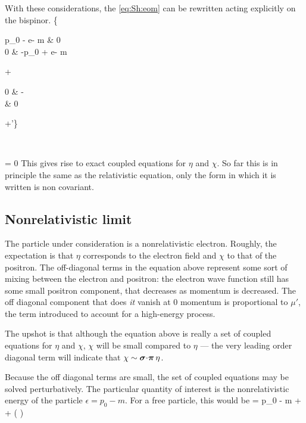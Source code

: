 With these considerations, the \eqref{eq:Sh:eom} can be rewritten acting explicitly on the bispinor.
\scriptsize
\beq \label{eq:Sh:matrixEOM}
	\left\{
		\begin{pmatrix}
			p_0 - e\Phi	- m &	0	\\
			0	&	-p_0 + e\Phi - m	\\
		\end{pmatrix}
		+
		\begin{pmatrix}	0 & -\sigdotg{\pi} \\  \sigdotg{\pi} & 0 \end{pmatrix} 
		+\mu' 
	\right\} \begin{pmatrix} \eta \\ \chi \end{pmatrix}
		= 0
\eeq
\normalsize
This gives rise to exact coupled equations for $\eta$ and $\chi$.  So far this is in principle the same as the relativistic equation, only the form in which it is written is non covariant.

\subsection{Nonrelativistic limit}

The particle under consideration is a nonrelativistic electron.  Roughly, the expectation is that $\eta$ corresponds to the electron field and $\chi$ to that of the positron.  The off-diagonal terms in the equation above represent some sort of mixing between the electron and positron: the electron wave function still has some small positron component, that decreases as momentum is decreased.    The off diagonal component that does \emph{it} vanish at 0 momentum is proportional to $\mu'$, the term introduced to account for a high-energy process.

The upshot is that although the equation above is really a set of coupled equations for $\eta$ and $\chi$, $\chi$ will be small compared to $\eta$ --- the very leading order diagonal term will indicate that $\chi \sim \mbox{\boldmath$ \sigma $} \hspace{-2pt} \cdot \hspace{-2pt} \mbox{\boldmath$ \pi $} \, \eta$.

Because the off diagonal terms are small, the set of coupled equations may be solved perturbatively.  The particular quantity of interest is the nonrelativistic energy of the particle $\epsilon = p_0 - m$.  For a free particle, this would be
\beq
	\epsilon = p_0 - m \approx {} +  + \left ( \right )
\eeq  

